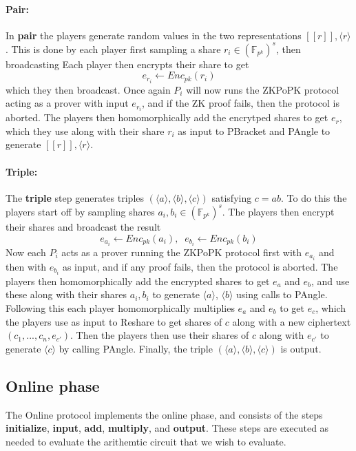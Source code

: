 \documentclass[../main.tex]{subfiles}
\begin{document}
\paragraph{Pair:}
In \textbf{pair} the players generate random values in the two representations $[\![ r ]\!], \langle r \rangle$. This is done by each player first sampling a share $r_i \in (\mathbb{F}_{p^k})^s$, then broadcasting Each player then encrypts their share to get $$e_{r_i} \leftarrow Enc_{pk}(r_i)$$ which they then broadcast. Once again $P_i$ will now runs the ZKPoPK protocol acting as a prover with input $e_{r_i}$, and if the ZK proof fails, then the protocol is aborted.
The players then homomorphically add the encrytped shares to get $e_r$, which they use along with their share $r_i$ as input to PBracket and PAngle to generate $[\![ r ]\!], \langle r \rangle$.

\paragraph{Triple:}
The \textbf{triple} step generates triples $(\langle a \rangle, \langle b \rangle, \langle c \rangle)$ satisfying $c = ab$. To do this the players start off by sampling shares $a_i, b_i \in (\mathbb{F}_{p^k})^s$.
The players then encrypt their shares and broadcast the result $$e_{a_i} \leftarrow Enc_{pk}(a_i), \;\; e_{b_i} \leftarrow Enc_{pk}(b_i)$$
Now each $P_i$ acts as a prover running the ZKPoPK protocol first with $e_{a_i}$ and then with $e_{b_i}$ as input, and if any proof fails, then the protocol is aborted.
The players then homomorphically add the encrypted shares to get $e_a$ and $e_b$, and use these along with their shares $a_i, b_i$ to generate $\langle a \rangle$, $\langle b \rangle$ using calls to PAngle.
Following this each player homomorphically multiplies $e_a$ and $e_b$ to get $e_c$, which the players use as input to Reshare to get shares of $c$ along with a new ciphertext $(c_1, ..., c_n, e_{c'})$. Then the players then use their shares of $c$ along with $e_{c'}$ to generate $\langle c \rangle$ by calling PAngle. Finally, the triple $(\langle a \rangle, \langle b \rangle, \langle c \rangle)$ is output.


\subsection{Online phase} \label{subsection: Online}
The Online protocol implements the online phase,
and consists of the steps \textbf{initialize}, \textbf{input}, \textbf{add}, \textbf{multiply}, and \textbf{output}. These steps are executed as needed to evaluate the arithemtic circuit that we wish to evaluate.
\end{document}
